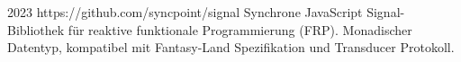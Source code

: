 \cventry
{2023}
{https://github.com/syncpoint/signal}
{}
{}
{}
{
  Synchrone JavaScript Signal-Bibliothek für reaktive funktionale Programmierung (FRP).
  Monadischer Datentyp, kompatibel mit Fantasy-Land Spezifikation und
  Transducer Protokoll.
}
